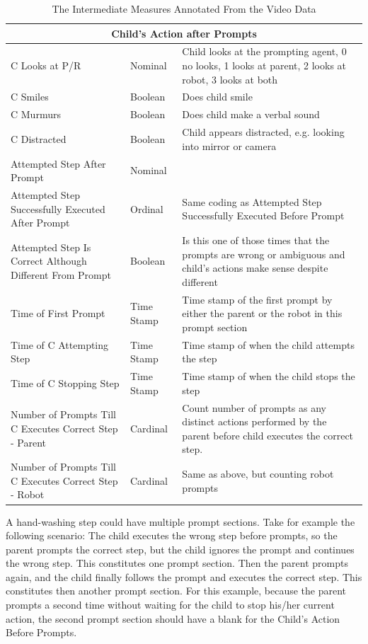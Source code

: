 \documentclass{ut-thesis}
\begin{document}
\begin{table}[h]
\begin{tabular}{ | p{5cm} | l | p{7cm} | }
		\multicolumn{3}{|c|}{\textbf{Child's Action after Prompts}} \\	\hline

		C Looks at P/R	&	Nominal	&	Child looks at the prompting agent, 0 no looks, 1 looks at parent, 2 looks at robot, 3 looks at both	\\	\hline
		C Smiles	&	Boolean	&	Does child smile	\\	\hline
		C Murmurs	&	Boolean	&	Does child make a verbal sound	\\	\hline
		C Distracted	&	Boolean	&	Child appears distracted, e.g. looking into mirror or camera \\	\hline

		Attempted Step After Prompt	&	Nominal	&	\\	\hline
		Attempted Step Successfully Executed After Prompt	&	Ordinal	&	Same coding as Attempted Step Successfully Executed Before Prompt	\\	\hline
		Attempted Step Is Correct Although Different From Prompt	&	Boolean	&	Is this one of those times that the prompts are wrong or ambiguous and child's actions make sense despite different	\\	\hline
		Time of First Prompt	&	Time Stamp	&	Time stamp of the first prompt by either the parent or the robot in this prompt section	\\	\hline
		Time of C Attempting Step	&	Time Stamp	&	Time stamp of when the child attempts the step	\\	\hline
		Time of C Stopping Step	&	Time Stamp	&	Time stamp of when the child stops the step	\\	\hline
		Number of Prompts Till C Executes Correct Step - Parent	&	Cardinal	&	Count number of prompts as any distinct actions performed by the parent before child executes the correct step.	\\	\hline
		Number of Prompts Till C Executes Correct Step - Robot	&	Cardinal	&	Same as above, but counting robot prompts	\\	\hline

	\end{tabular}
	\caption{The Intermediate Measures Annotated From the Video Data}
	\label{tab:IntermediateMeasures}
\end{table}

A hand-washing step could have multiple prompt sections.  Take for example the following scenario: The child executes the wrong step before prompts, so the parent prompts the correct step, but the child ignores the prompt and continues the wrong step.  This constitutes one prompt section.  Then the parent prompts again, and the child finally follows the prompt and executes the correct step.  This constitutes then another prompt section.  For this example, because the parent prompts a second time without waiting for the child to stop his/her current action, the second prompt section should have a blank for the Child's Action Before Prompts.
\end{document}
